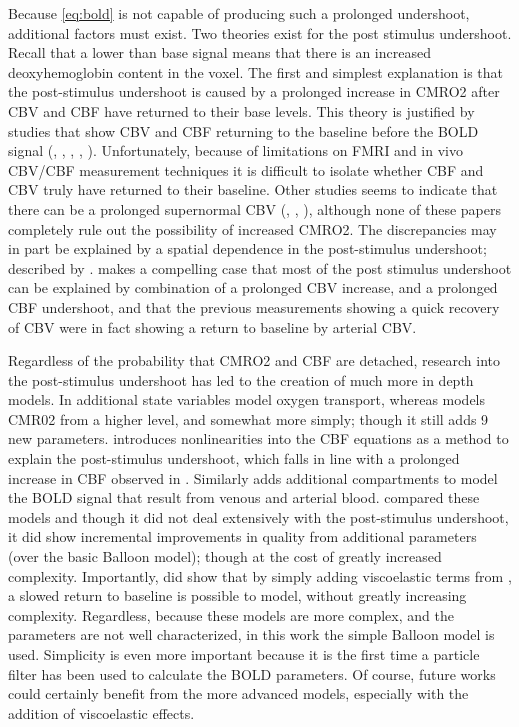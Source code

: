 Because \autoref{eq:bold} is not capable of producing such a prolonged undershoot,
additional factors must exist.  Two theories exist for the post stimulus undershoot.
Recall
that a lower than base signal means that there is an increased deoxyhemoglobin
content in the voxel. The first and simplest explanation is that the post-stimulus
undershoot is caused by a prolonged increase in CMRO2 after CBV and CBF
have returned to their base levels. This theory is justified by 
studies that show CBV and CBF returning to the baseline before the BOLD signal
(\cite{Frahm2008}, \cite{Donahue2009}, \cite{Buxton2004}, \cite{Lu2004},
\cite{Shen2008}). Unfortunately, because of limitations on FMRI and in vivo
CBV/CBF measurement techniques it is difficult to isolate whether CBF and
CBV truly have returned to their baseline. Other studies seems to indicate
that there can be a prolonged supernormal CBV (\cite{Mandeville1999a}, 
\cite{Behzadi2005}, \cite{Chen2009a}), although none of these papers completely
rule out the possibility of increased CMRO2. The discrepancies may in part
be explained by a spatial dependence in the post-stimulus undershoot; described
by \cite{Yacoub2006}. \cite{Chen2009}
makes a compelling case that most of the post stimulus undershoot can be 
explained by combination of a prolonged CBV increase, and a prolonged CBF 
undershoot, and that
the previous measurements showing a quick recovery of CBV 
were in fact showing a return to baseline by arterial CBV.

Regardless of the probability that CMRO2 and CBF are detached,
research into the post-stimulus undershoot has led to the creation
of much more in depth models. In \cite{Zheng2002} additional state
variables model oxygen transport, whereas \cite{Buxton2004} models
CMR02 from a higher level, and somewhat more simply; though it 
still adds 9 new parameters. \cite{Behzadi2005}
introduces nonlinearities into the CBF equations as a method to
explain the post-stimulus undershoot, which falls in line with a 
prolonged increase in CBF observed in \cite{Chen2009}. Similarly
\cite{Zheng2005} adds additional compartments to model the BOLD signal
that result from venous and arterial blood. 
\cite{Deneux2006} compared these models and though it did 
not deal extensively with the 
post-stimulus undershoot, it did show incremental improvements
in quality from additional parameters (over the basic Balloon model);
though at the cost of greatly increased complexity.
Importantly,\cite{Deneux2006} did show that by 
simply adding viscoelastic terms from \cite{Buxton2004}, a slowed return 
to baseline is possible to model, without greatly increasing
complexity. Regardless, because these models are more 
complex, and the parameters are not well characterized, in this work the simple
Balloon model is used. Simplicity is even more important because
it is the first time a particle filter has been used to calculate the
BOLD parameters. Of course, future works could certainly benefit from
the more advanced models, especially with the addition of viscoelastic
effects.


